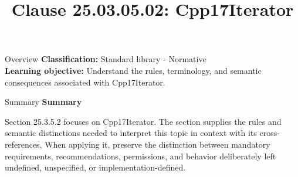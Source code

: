 \documentclass[10pt,letterpaper]{article}
\title{Clause 25.03.05.02: Cpp17Iterator}
\author{}
\date{}
\begin{document}
\maketitle
\begin{CornellOverviewBox}{Overview}
\textbf{Classification:} Standard library - Normative\\[2pt]
\textbf{Learning objective:} Understand the rules, terminology, and semantic consequences associated with Cpp17Iterator.
\end{CornellOverviewBox}\begin{CornellSummaryBox}{Summary}
{\sffamily\bfseries\color{Accent} Summary}\par\vspace{3pt}Section 25.3.5.2 focuses on Cpp17Iterator. The section supplies the rules and semantic distinctions needed to interpret this topic in context with its cross-references. When applying it, preserve the distinction between mandatory requirements, recommendations, permissions, and behavior deliberately left undefined, unspecified, or implementation-defined.
\end{CornellSummaryBox}
\end{document}
